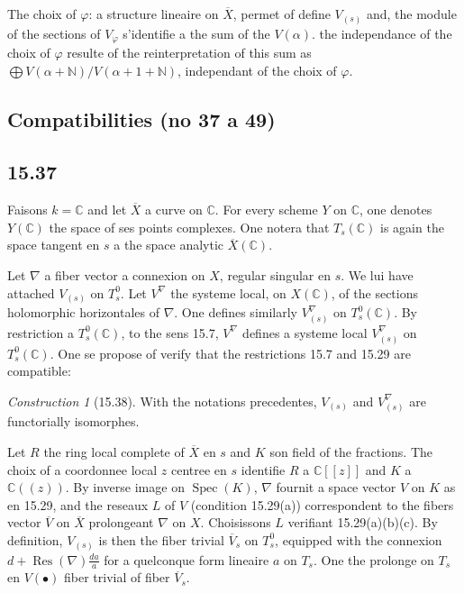 \documentclass[12pt,a4paper]{article}
\theoremstyle{plain}
\theoremstyle{definition}
\theoremstyle{remark}
\newtheorem{construction}[theorem]{Construction}
\DeclareMathOperator{\Spec}{Spec}
\DeclareMathOperator{\Res}{Res}
\newcommand{\bC}{\mathbb{C}}
\newcommand{\bN}{\mathbb{N}}
\begin{document}
The choix of $\varphi$: a structure lineaire on $\overline{X}$, permet of define $V_{(s)}$ and, the module of the sections of $V_\varphi$ s'identifie a the sum of the $V(\alpha)$. the independance of the choix of $\varphi$ resulte of the reinterpretation of this sum as $\bigoplus V(\alpha + \bN)/V(\alpha + 1 + \bN)$, independant of the choix of $\varphi$.


\subsection*{Compatibilities (no 37 a 49)}

\subsection*{15.37}

Faisons $k = \bC$ and let $\overline{X}$ a curve on $\bC$. For every scheme $Y$ on $\bC$, one denotes $Y(\bC)$ the space of ses points complexes. One notera that $T_s(\bC)$ is again the space tangent en $s$ a the space analytic $\overline{X}(\bC)$.

Let $\nabla$ a fiber vector a connexion on $X$, regular singular en $s$. We lui have attached $V_{(s)}$ on $T_s^0$. Let $V^\nabla$ the systeme local, on $X(\bC)$, of the sections holomorphic horizontales of $\nabla$. One defines similarly $V_{(s)}^\nabla$ on $T_s^0(\bC)$. By restriction a $T_s^0(\bC)$, to the sens 15.7, $V^\nabla$ defines a systeme local $V_{(s)}^\nabla$ on $T_s^0(\bC)$. One se propose of verify that the restrictions 15.7 and 15.29 are compatible:

\begin{construction}[15.38]
With the notations precedentes, $V_{(s)}$ and $V^\nabla_{(s)}$ are functorially isomorphes.
\end{construction}

Let $R$ the ring local complete of $\overline{X}$ en $s$ and $K$ son field of the fractions. The choix of a coordonnee local $z$ centree en $s$ identifie $R$ a $\bC[[z]]$ and $K$ a $\bC((z))$. By inverse image on $\Spec(K)$, $\nabla$ fournit a space vector $V$ on $K$ as en 15.29, and the reseaux $L$ of $V$ (condition 15.29(a)) correspondent to the fibers vector $\overline{V}$ on $\overline{X}$ prolongeant $\nabla$ on $X$. Choisissons $L$ verifiant 15.29(a)(b)(c). By definition, $V_{(s)}$ is then the fiber trivial $\overline{V}_s$ on $T_s^0$, equipped with the connexion $d + \Res(\nabla) \frac{da}{a}$ for a quelconque form lineaire $a$ on $T_s$. One the prolonge on $T_s$ en $V(\bullet)$ fiber trivial of fiber $\overline{V}_s$.
\end{document}
